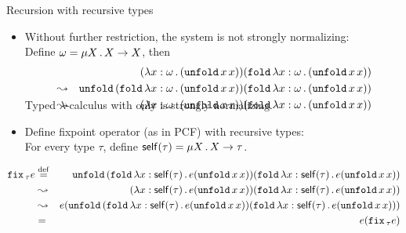 \documentclass[paper=screen,mode=present,style=zysimple]{powerdot}
\begin{document}
\begin{slide}{Recursion with recursive types}
\begin{itemize}
\item Without further restriction, the system is not strongly normalizing:
\\
Define $\omega = \mu X \, . \, X \to X$, then  
\begin{eqnarray*}
& & 
(\lambda x: \omega \, . \, (\mathtt{unfold}\, x \, x)) (\mathtt{fold}\, \lambda x : \omega \, . \, (\mathtt{unfold}\, x \, x))
\\ & \leadsto & 
\mathtt{unfold}\, (\mathtt{fold}\, \lambda x : \omega \, . \, (\mathtt{unfold}\, x \, x)) (\mathtt{fold}\, \lambda x : \omega \, . \, (\mathtt{unfold}\, x \, x))
\\ & \leadsto & 
(\lambda x : \omega \, . \, (\mathtt{unfold}\, x \, x)) (\mathtt{fold}\, \lambda x : \omega \, . \, (\mathtt{unfold}\, x \, x))
\\[-2em]
\end{eqnarray*}
Typed $\lambda$-calculus with only  is strongly normalizing.
\item Define fixpoint operator (as in PCF) with recursive types: \\
For every type $\tau$, define $\mathsf{self}(\tau) = \mu X \, . \, X \to \tau$.
\vspace*{-1.5em}
\end{itemize}
\small
\begin{eqnarray*}
\mathtt{fix}\,_\tau e & \stackrel{\mathrm{def}}{=} & 
\mathtt{unfold}\, (\mathtt{fold}\, \lambda x: \mathsf{self}(\tau) \, . \, e (\mathtt{unfold}\, x \, x)) 
(\mathtt{fold}\, \lambda x: \mathsf{self}(\tau) \, . \, e (\mathtt{unfold}\, x \, x)) \\
& \leadsto & 
(\lambda x: \mathsf{self}(\tau) \, . \, e (\mathtt{unfold}\, x \, x)) 
(\mathtt{fold}\, \lambda x: \mathsf{self}(\tau) \, . \, e (\mathtt{unfold}\, x \, x)) \\
& \leadsto & 
e (\mathtt{unfold}\, (\mathtt{fold}\, \lambda x: \mathsf{self}(\tau) \, . \, e (\mathtt{unfold}\, x \, x)) 
(\mathtt{fold}\, \lambda x: \mathsf{self}(\tau) \, . \, e (\mathtt{unfold}\, x \, x))) \\
& = & 
e ( \mathtt{fix}\,_\tau e)
\end{eqnarray*}
\end{slide}
\end{document}
